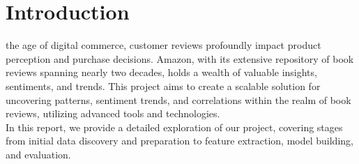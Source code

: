 \section{Introduction}
the age of digital commerce, customer reviews profoundly impact product perception and purchase decisions.
Amazon, with its extensive repository of book reviews spanning nearly two decades, holds a wealth of valuable insights,
sentiments, and trends. This project aims to create a scalable solution for uncovering patterns, sentiment trends,
and correlations within the realm of book reviews, utilizing advanced tools and technologies.\\
In this report, we provide a detailed exploration of our project, covering stages from initial data discovery
and preparation to feature extraction, model building, and evaluation.

